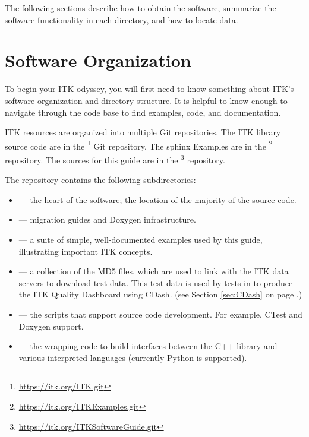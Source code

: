 The following sections describe how to obtain the software, summarize the
software functionality in each directory, and how to locate data.

\section{Software Organization}
\label{sec:SoftwareOrganization}

To begin your ITK odyssey, you will first need to know something about
ITK's software organization and directory structure. It is helpful to
know enough to navigate through the code base to find examples, code,
and documentation.

ITK resources are organized into multiple Git repositories. The ITK library source
code are in the \footnote{\url{https://itk.org/ITK.git}} Git
repository. The sphinx Examples are in the
\footnote{\url{https://itk.org/ITKExamples.git}} repository.
The sources for this guide are in the
\footnote{\url{https://itk.org/ITKSoftwareGuide.git}}
repository.

The  repository contains the following subdirectories:
\begin{itemize}
        \item {} --- the heart of the software; the location
        of the majority of the source code.
        \item {} --- migration guides and Doxygen infrastructure.
        \item {} --- a suite of simple, well-documented
        examples used by this guide, illustrating important
        ITK concepts.
        \item {} --- a collection of the MD5 files, which are
used to link with the ITK data servers to download test data. This test data is
used by tests in  to produce the ITK Quality Dashboard using
CDash.
        (see Section \ref{sec:CDash} on page \pageref{sec:CDash}.)
        \item {} --- the scripts that support source code development. For example, CTest and Doxygen support.
        \item {} --- the wrapping code to build interfaces between the C++ library and various interpreted languages (currently Python is supported).
\end{itemize}

